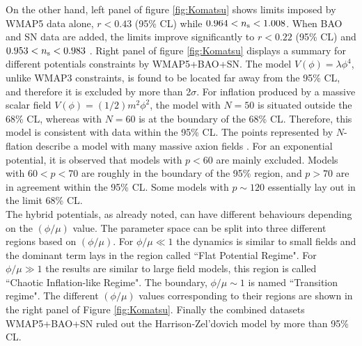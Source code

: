 \documentclass{rmaa}
\begin{document}
On the other hand, left panel of figure \ref{fig:Komatsu} shows limits imposed by WMAP5 data alone,   
$r < 0.43$ (95\% CL) while $0.964< n_{\rm s}<1.008$.
When BAO and SN data are added, the limits improve significantly to 
$r < 0.22$ (95\% CL) and {$0.953< n_{\rm s}<0.983$ \citep{Komatsu}}.
Right panel of figure \ref{fig:Komatsu} displays a summary for different potentials constraints by WMAP5+BAO+SN.
The model $V(\phi)=\lambda \phi^4$, unlike WMAP3 constraints, is found to be located 
far away from the 95\% CL, and therefore it is excluded by more than 2$\sigma$. For inflation produced by a massive 
scalar field $V(\phi)=(1/2)m^2\phi^2$, the model with $N=50$ is situated outside the 
68\% CL, whereas with $N=60$ is at the boundary of the 68\% CL. 
Therefore, this model is consistent with data within the 95\% CL. 
The points represented by $N$-flation describe a model with many massive axion fields \citep{Liddle3}. 
For an exponential potential, it is observed that models with $p<60$ are mainly excluded.
Models with $60<p<70$ are roughly in the boundary of the 95\% region, and $p>70$ are 
in agreement within the 95\% CL. 
Some models with $p\sim 120$ essentially lay out in the limit 68\% CL.
\\

The hybrid potentials, as already noted, can have different behaviours
depending on the $(\phi/ \mu)$ value. The parameter space can be split into three 
different regions based on $(\phi / \mu)$. For $\phi / \mu \ll 1$ the dynamics is similar to small
fields and the dominant term lays in the region called ``Flat Potential Regime". 
For $\phi / \mu \gg 1$ the results are similar to large field models, this region is called
``Chaotic Inflation-like Regime". The boundary, $\phi / \mu \sim 1$ is named 
``Transition regime". The different $(\phi / \mu)$ values corresponding to their regions
are shown in the right panel of Figure \ref{fig:Komatsu}.
Finally the combined datasets WMAP5+BAO+SN ruled out the Harrison-Zel'dovich model
by more than 95\% CL.
\\
\end{document}
